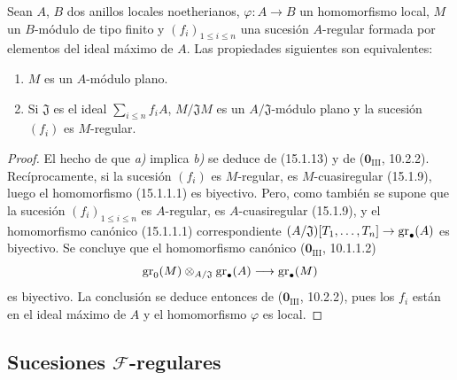 \begin{proposition}[15.1.21]
\label{0.15.1.21-fr}
Sean $A$, $B$ dos anillos locales noetherianos, $\varphi:A\to B$ un
homomorfismo local, $M$ un $B$-módulo de tipo finito y
$(f_i)_{1\leq i\leq n}$ una sucesión $A$-regular formada por elementos del
ideal máximo de $A$. Las propiedades siguientes son equivalentes:
\begin{enumerate}
  \item[\textup{a)}] $M$ es un $A$-módulo plano.
  \item[\textup{b)}] Si $\mathfrak{J}$ es el ideal $\sum_{i\leq n}f_iA$,
  $M/\mathfrak{J}M$ es un $A/\mathfrak{J}$-módulo plano y la sucesión $(f_i)$
  es $M$-regular.
\end{enumerate}
\end{proposition}

\begin{proof}
El hecho de que \emph{a)} implica \emph{b)} se deduce de (15.1.13) y de
($\mathbf{0}_{\mathrm{III}}$, 10.2.2). Recíprocamente, si la sucesión $(f_i)$ es
$M$-regular, es $M$-cuasiregular (15.1.9), luego el homomorfismo
(15.1.1.1) es biyectivo. Pero, como también se supone que la sucesión
$(f_i)_{1\leq i\leq n}$ es $A$-regular, es $A$-cuasiregular (15.1.9), y el
homomorfismo canónico (15.1.1.1) correspondiente
$(A/\mathfrak{J})[T_1,\ldots,T_n]\to\operatorname{gr}_\bullet(A)$ es biyectivo. Se concluye
que el homomorfismo canónico ($\mathbf{0}_{\mathrm{III}}$, 10.1.1.2)
\[
  \operatorname{gr}_0(M)\otimes_{A/\mathfrak{J}}\operatorname{gr}_\bullet(A)
  \longrightarrow\operatorname{gr}_\bullet(M)
\]
es biyectivo. La conclusión se deduce entonces de ($\mathbf{0}_{\mathrm{III}}$,
10.2.2), pues los $f_i$ están en el ideal máximo de $A$ y el homomorfismo
$\varphi$ es local.
\end{proof}

\subsection{Sucesiones \texorpdfstring{$\mathscr{F}$}{F}-regulares}
\label{subsection:0.15.2-fr}

